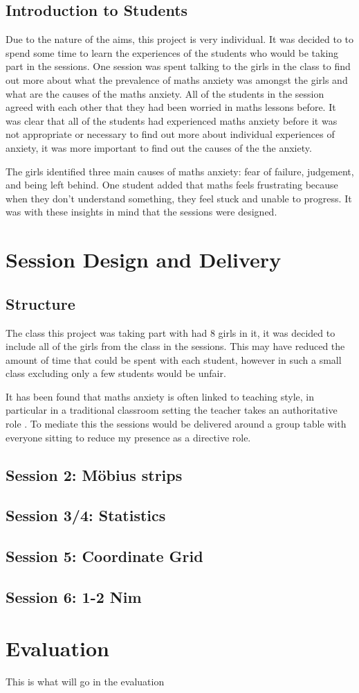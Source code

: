 \documentclass[11pt, a4paper, notitlepage]{article}
\begin{document}
\subsection{Introduction to Students}
Due to the nature of the aims, this project is very individual. It was decided to to spend some time to learn the experiences of the students who would be taking part in the sessions. One session was spent talking to the girls in the class to find out more about what the prevalence of maths anxiety was amongst the girls and what are the causes of the maths anxiety. All of the students in the session agreed with each other that they had been worried in maths lessons before. It was clear that all of the students had experienced maths anxiety before it was not appropriate or necessary to find out more about individual experiences of anxiety, it was more important to find out the causes of the the anxiety.
\par
The girls identified three main causes of maths anxiety: fear of failure, judgement, and being left behind. One student added that maths feels frustrating because when they don't understand something, they feel stuck and unable to progress. It was with these insights in mind that the sessions were designed.

\section{Session Design and Delivery}
\subsection{Structure}
The class this project was taking part with had 8 girls in it, it was decided to include all of the girls from the class in the sessions. This may have reduced the amount of time that could be spent with each student, however in such a small class excluding only a few students would be unfair. 
\par It has been found that maths anxiety is often linked to teaching style, in particular in a traditional classroom setting the teacher takes an authoritative role \cite{Finlayson:2014}. To mediate this the sessions would be delivered around a group table with everyone sitting to reduce my presence as a directive role. 

\subsection{Session 2: M\"obius strips}
\subsection{Session 3/4: Statistics}
\subsection{Session 5: Coordinate Grid}
\subsection{Session 6: 1-2 Nim}


\section{Evaluation}
This is what will go in the evaluation



\end{document}
